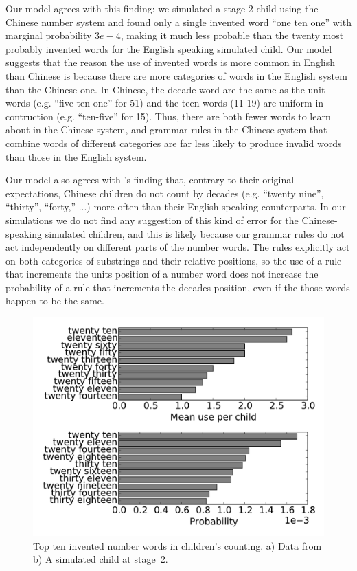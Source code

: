 \documentclass[10pt,letterpaper]{article}
\begin{document}
Our model agrees with this finding: we simulated a stage 2 child using
the Chinese number system and found only a single invented word ``one
ten one'' with marginal probability $3e-4$, making it much less
probable than the twenty most probably invented words for the English
speaking simulated child.  Our model suggests that the reason the use
of invented words is more common in English than Chinese is because
there are more categories of words in the English system than the
Chinese one. In Chinese, the decade word are the same as the unit
words (e.g. ``five-ten-one'' for 51) and the teen words (11-19) are
uniform in contruction (e.g. ``ten-five'' for 15). Thus, there are
both fewer words to learn about in the Chinese system, and grammar
rules in the Chinese system that combine words of different categories
are far less likely to produce invalid words than those in the English
system.

Our model also agrees with \citeauthor{miller1987counting}'s finding
that, contrary to their original expectations, Chinese children do not
count by decades (e.g. ``twenty nine'', ``thirty'', ``forty,'' ...)
more often than their English speaking counterparts. In our
simulations we do not find any suggestion of this kind of error for
the Chinese-speaking simulated children, and this is likely because
our grammar rules do not act independently on different parts of the
number words. The rules explicitly act on both categories of
substrings and their relative positions, so the use of a rule that
increments the units position of a number word does not increase the
probability of a rule that increments the decades position, even if
the those words happen to be the same.




\begin{figure}[t]
\includegraphics[width=0.9\linewidth]{figures/inventedWordComparison}
\caption{Top ten invented number words in children's counting. a) Data
  from \citeauthor{FusRicBriar1982} b) A simulated child at stage~2.
   \label{fig:inventedWordComparison}}
\end{figure}
\end{document}
